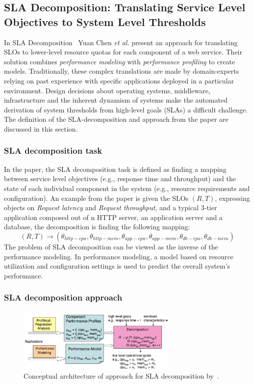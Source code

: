 \subsection{SLA Decomposition: Translating Service Level Objectives to System Level Thresholds}
In SLA Decomposition~\cite{chen2007sla} Yuan Chen \textit{et al.} present an approach for translating SLOs to lower-level resource quotas for each component of a web service. Their solution combines \textit{performance modeling} with \textit{performance profiling} to create models. Traditionally, these complex translations are made by domain-experts relying on past experience with specific applications deployed in a particular environment. Design decisions about operating systems, middleware, infrastructure and the inherent dynamism of systems make the automated derivation of system thresholds from high-level goals (SLAs) a difficult challenge.~\cite{chen2007sla}\\
The definition of the SLA-decomposition and approach from the paper are  discussed in this section.
\subsubsection{SLA decomposition task}
In the paper, the SLA decomposition task is defined as finding a mapping between  service level objectives (e.g., response time and throughput) and the state of each individual component in the system (e.g., resource requirements and configuration). An example from the paper is given the SLOs $(R,T)$, expressing objects on \textit{Request latency} and \textit{Request throughput}, and a typical 3-tier application composed out of n HTTP server, an application server and a database, the decomposition is finding the following mapping:
\begin{equation}
(R,T) \rightarrow (\theta_{http-cpu},\theta_{http-mem},\theta_{app-cpu},\theta_{app-mem},\theta_{db-cpu},\theta_{db-mem} )
\end{equation}
The problem of SLA decomposition can be viewed as the inverse of the performance modeling. In performance modeling, a model based on resource utilization and configuration settings is used to predict the overall system's performance.~\cite{chen2007sla}


\subsubsection{SLA decomposition approach}
\begin{figure}[H]
    \centering
    \includegraphics[width=0.7\textwidth]{chapter-related-work/images-decomp/sla-decomp-paper.png}
    \caption{Conceptual architecture of approach for SLA decomposition by~\cite{chen2007sla}.}
    \label{fig:decomp-architecture}
\end{figure}

